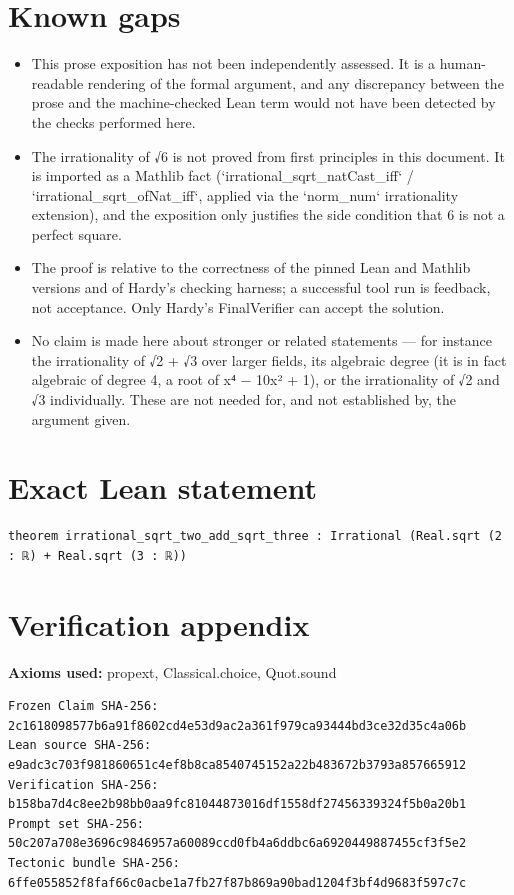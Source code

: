 \documentclass[11pt]{article}
\begin{document}
\section*{Known gaps}
\begin{itemize}
\item This prose exposition has not been independently assessed. It is a human-readable rendering of the formal argument, and any discrepancy between the prose and the machine-checked Lean term would not have been detected by the checks performed here.
\item The irrationality of √6 is not proved from first principles in this document. It is imported as a Mathlib fact (`irrational\_sqrt\_natCast\_iff` / `irrational\_sqrt\_ofNat\_iff`, applied via the `norm\_num` irrationality extension), and the exposition only justifies the side condition that 6 is not a perfect square.
\item The proof is relative to the correctness of the pinned Lean and Mathlib versions and of Hardy's checking harness; a successful tool run is feedback, not acceptance. Only Hardy's FinalVerifier can accept the solution.
\item No claim is made here about stronger or related statements — for instance the irrationality of √2 + √3 over larger fields, its algebraic degree (it is in fact algebraic of degree 4, a root of x⁴ − 10x² + 1), or the irrationality of √2 and √3 individually. These are not needed for, and not established by, the argument given.
\end{itemize}

\section*{Exact Lean statement}
\begin{Verbatim}[fontsize=\small]
theorem irrational_sqrt_two_add_sqrt_three : Irrational (Real.sqrt (2 : ℝ) + Real.sqrt (3 : ℝ))
\end{Verbatim}

\section*{Verification appendix}
\textbf{Axioms used:} propext, Classical.choice, Quot.sound

\begin{Verbatim}[fontsize=\small]
Frozen Claim SHA-256: 2c1618098577b6a91f8602cd4e53d9ac2a361f979ca93444bd3ce32d35c4a06b
Lean source SHA-256: e9adc3c703f981860651c4ef8b8ca8540745152a22b483672b3793a857665912
Verification SHA-256: b158ba7d4c8ee2b98bb0aa9fc81044873016df1558df27456339324f5b0a20b1
Prompt set SHA-256: 50c207a708e3696c9846957a60089ccd0fb4a6ddbc6a6920449887455cf3f5e2
Tectonic bundle SHA-256: 6ffe055852f8faf66c0acbe1a7fb27f87b869a90bad1204f3bf4d9683f597c7c
\end{Verbatim}
\end{document}
